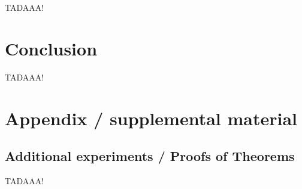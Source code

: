 \documentclass{article}
\begin{document}
TADAAA!

\section{Conclusion}\label{sec:concl}

TADAAA!







\newpage
\appendix
\section{Appendix / supplemental material}\label{app}

\subsection{Additional experiments / Proofs of Theorems}\label{app:exp}

TADAAA!
\end{document}
